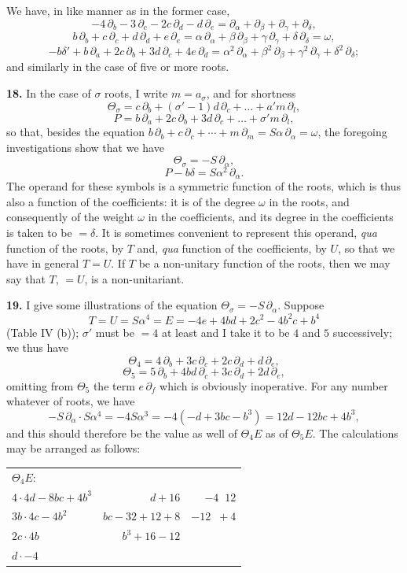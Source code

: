 \documentclass[11pt]{article}
\begin{document}
We have, in like manner as in the former case,
\[
-4\,\partial_b - 3\,\partial_c - 2c\,\partial_d - d\,\partial_e = \partial_\alpha + \partial_\beta + \partial_\gamma + \partial_\delta,
\]
\[
b\,\partial_b + c\,\partial_c + d\,\partial_d + e\,\partial_e = \alpha\,\partial_\alpha + \beta\,\partial_\beta + \gamma\,\partial_\gamma + \delta\,\partial_\delta = \omega,
\]
\[
-b\delta' + b\,\partial_a + 2c\,\partial_b + 3d\,\partial_c + 4e\,\partial_d = \alpha^2\,\partial_\alpha + \beta^2\,\partial_\beta + \gamma^2\,\partial_\gamma + \delta^2\,\partial_\delta;
\]
and similarly in the case of five or more roots.

\textbf{18.} In the case of $\sigma$ roots, I write $m = a_\sigma$, and for shortness
\[
\Theta_\sigma = c\,\partial_b + (\sigma'-1)d\,\partial_c + \ldots + a'm\,\partial_l,
\]
\[
P = b\,\partial_a + 2c\,\partial_b + 3d\,\partial_c + \ldots + \sigma'm\,\partial_l,
\]
so that, besides the equation $b\,\partial_b + c\,\partial_c + \cdots + m\,\partial_m = S\alpha\,\partial_\alpha = \omega$, the foregoing investigations show that we have
\[
\Theta_\sigma = -S\,\partial_\alpha,
\]
\[
P - b\delta = S\alpha^2\,\partial_\alpha.
\]
The operand for these symbols is a symmetric function of the roots, which is thus also a function of the coefficients: it is of the degree $\omega$ in the roots, and consequently of the weight $\omega$ in the coefficients, and its degree in the coefficients is taken to be $= \delta$. It is sometimes convenient to represent this operand, \textit{qua} function of the roots, by $T$ and, \textit{qua} function of the coefficients, by $U$, so that we have in general $T = U$. If $T$ be a non-unitary function of the roots, then we may say that $T$, $= U$, is a non-unitariant.

\textbf{19.} I give some illustrations of the equation $\Theta_\sigma = -S\,\partial_\alpha$. Suppose
\[
T = U = S\alpha^4 = E = -4e + 4bd + 2c^2 - 4b^2 c + b^4
\]
(Table IV (b)); $\sigma'$ must be $= 4$ at least and I take it to be $4$ and $5$ successively; we thus have
\[
\Theta_4 = 4\,\partial_b + 3c\,\partial_c + 2c\,\partial_d + d\,\partial_e,
\]
\[
\Theta_5 = 5\,\partial_b + 4bd\,\partial_c + 3c\,\partial_d + 2d\,\partial_e,
\]
omitting from $\Theta_5$ the term $e\,\partial_f$ which is obviously inoperative. For any number whatever of roots, we have
\[
-S\,\partial_\alpha\cdot S\alpha^4 = -4 S\alpha^3 = -4(-d + 3bc - b^3) = 12d - 12bc + 4b^3,
\]
and this should therefore be the value as well of $\Theta_4 E$ as of $\Theta_5 E$. The calculations may be arranged as follows:
\begin{center}
\begin{tabular}{l@{\quad}r@{\quad}r}
$\Theta_4 E$: & & \\
$4 \cdot 4d - 8bc + 4b^3$ & $d + 16$ & $-4\;\;12$ \\
$3b \cdot 4c - 4b^2$ & $bc - 32 + 12 + 8$ & $-12\;\;+4$ \\
$2c \cdot 4b$ & $b^3 + 16 - 12$ & \\
$d \cdot -4$ & & \\
\end{tabular}
\end{center}
\end{document}
